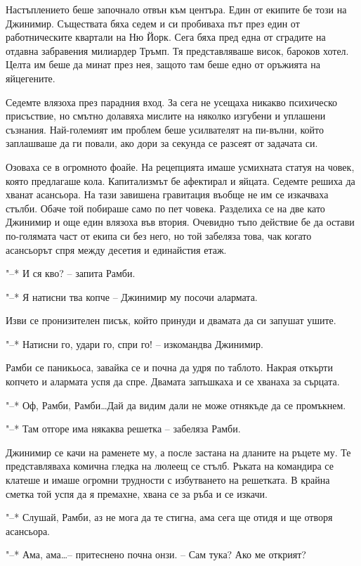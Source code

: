 \documentclass[ebook,openany,12pt]{memoir}
\begin{document}
Настъплението беше започнало отвън към центъра. Един от екипите бе този на Джинимир. Съществата бяха седем и си пробиваха път през един от работническите квартали на Ню Йорк. Сега бяха пред една от сградите на отдавна забравения милиардер Тръмп. Тя представляваше висок, бароков хотел. Целта им беше да минат през нея, защото там беше едно от оръжията на яйцегените.

Седемте влязоха през парадния вход. За сега не усещаха никакво психическо присъствие, но смътно долавяха мислите на няколко изгубени и уплашени съзнания. Най-големият им проблем беше усилвателят на пи-вълни, който заплашваше да ги повали, ако дори за секунда се разсеят от задачата си.

Озоваха се в огромното фоайе. На рецепцията имаше усмихната статуя на човек, която предлагаше кола. Капитализмът бе афектирал и яйцата. Седемте решиха да хванат асансьора. На тази завишена гравитация въобще не им се изкачваха стълби. Обаче той побираше само по пет човека. Разделиха се на две като Джинимир и още един влязоха във втория. Очевидно тъпо действие бе да остави по-голямата част от екипа си без него, но той забеляза това, чак когато асансьорът спря между десетия и единайстия етаж.

"--* И ся кво? – запита Рамби.

"--* Я натисни тва копче – Джинимир му посочи алармата.

Изви се пронизителен писък, който принуди и двамата да си запушат ушите.

"--* Натисни го, удари го, спри го! – изкомандва Джинимир.

Рамби се паникьоса, завайка се и почна да удря по таблото. Накрая откърти копчето и алармата успя да спре. Двамата запъшкаха и се хванаха за сърцата.

"--* Оф, Рамби, Рамби\ldots Дай да видим дали не може отнякъде да се промъкнем.

"--* Там отгоре има някаква решетка – забеляза Рамби.

Джинимир се качи на раменете му, а после застана на дланите на ръцете му. Те представляваха комична гледка на люлеещ се стълб. Ръката на командира се клатеше и имаше огромни трудности с избутването на решетката. В крайна сметка той успя да я премахне, хвана се за ръба и се изкачи.

"--* Слушай, Рамби, аз не мога да те стигна, ама сега ще отидя и ще отворя асансьора.

"--* Ама, ама\ldots – притеснено почна онзи. – Сам тука? Ако ме открият?
\end{document}
